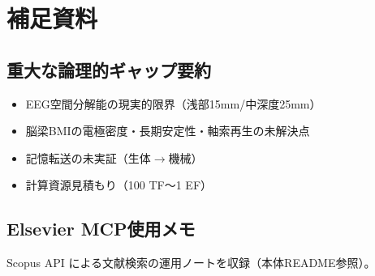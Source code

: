 \appendix
\chapter{補足資料}
\section{重大な論理的ギャップ要約}
\begin{itemize}
  \item EEG空間分解能の現実的限界（浅部15mm/中深度25mm）
  \item 脳梁BMIの電極密度・長期安定性・軸索再生の未解決点
  \item 記憶転送の未実証（生体\(\rightarrow\)機械）
  \item 計算資源見積もり（100 TF〜1 EF）
\end{itemize}

\section{Elsevier MCP使用メモ}
Scopus API による文献検索の運用ノートを収録（本体README参照）。


